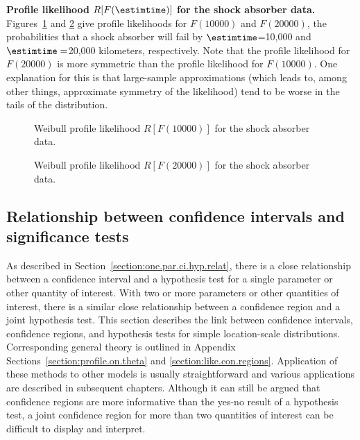 \begin{example}
{\bf Profile likelihood $R[F(\estimtime)]$ for the shock absorber data.} 
Figures~\ref{figure:shockabsB.weib.F10k.profile.ps} and
\ref{figure:shockabsB.weib.F20k.profile.ps} give profile likelihoods
for $F(10000)$ and $F(20000)$, the probabilities that a shock absorber
will fail by $\estimtime$=10,000 and $\estimtime=$20,000 kilometers,
respectively. Note that the profile likelihood for $F(20000)$ is more
symmetric than the profile likelihood for $F(10000)$. One explanation
for this is that large-sample approximations (which leads to, among
other things, approximate symmetry of the likelihood) tend to be worse
in the tails of the distribution.
\begin{figure}
\caption{Weibull profile likelihood
$R[F(10000)]$ for the shock absorber data.}
\label{figure:shockabsB.weib.F10k.profile.ps}
\end{figure}
\begin{figure}
\caption{Weibull profile likelihood
$R[F(20000)]$ for the shock absorber data.}
\label{figure:shockabsB.weib.F20k.profile.ps}
\end{figure}
\end{example}

\subsection{Relationship between confidence intervals and significance
tests} 
\label{section:two.par.ci.hyp.relat}

As described in Section~\ref{section:one.par.ci.hyp.relat}, there is
a close relationship between a confidence interval and a hypothesis
test for a single parameter or other quantity of interest. With two
or more parameters or other quantities of interest, there is a
similar close relationship between a confidence region and a joint
hypothesis test.  This section describes the link between confidence
intervals, confidence regions, and hypothesis tests for simple
location-scale distributions.  Corresponding general theory is
outlined in Appendix Sections~\ref{section:profile.on.theta} and
\ref{section:like.con.regions}. Application of these methods to
other models is usually straightforward and various applications are
described in subsequent chapters.  Although it can still be argued
that confidence regions are more informative than the yes-no result
of a hypothesis test, a joint confidence region for more than two
quantities of interest can be difficult to display and interpret.

